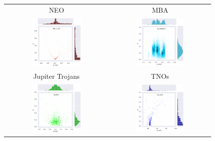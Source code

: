 \begin{figure}
	\centering
	\begin{tabular}{cc}
		NEO & MBA\\
		\includegraphics[width=0.5\textwidth]{neo_ae.png} &
		\includegraphics[width=0.5\textwidth]{mba_ae.png} \\
		Jupiter Trojans & TNOs\\
		\includegraphics[width=0.5\textwidth]{trojan_ae.png} &
		\includegraphics[width=0.5\textwidth]{tno_ae.png}
	\end{tabular}
	

\end{figure}
